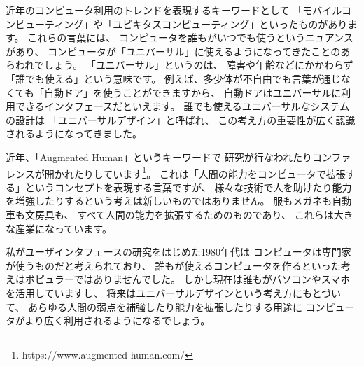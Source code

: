 \documentclass[topics]{compsoft} %
\begin{document}
近年のコンピュータ利用のトレンドを表現するキーワードとして
「モバイルコンピューティング」や「ユビキタスコンピューティング」といったものがあります。
これらの言葉には、
コンピュータを誰もがいつでも使うというニュアンスがあり、
コンピュータが「ユニバーサル」に使えるようになってきたことのあらわれでしょう。
%
「ユニバーサル」というのは、
障害や年齢などにかかわらず「誰でも使える」という意味です。
例えば、多少体が不自由でも言葉が通じなくても「自動ドア」を使うことができますから、
自動ドアはユニバーサルに利用できるインタフェースだといえます。
%
誰でも使えるユニバーサルなシステムの設計は
「ユニバーサルデザイン」と呼ばれ、
この考え方の重要性が広く認識されるようになってきました。




近年、「Augmented Human」というキーワードで
研究が行なわれたりコンファレンスが開かれたりしています\footnote{
  \textsf{https:{\slash}{\slash}www.augmented-human.com{\slash}}
}。
これは「人間の能力をコンピュータで拡張する」というコンセプトを表現する言葉ですが、
様々な技術で人を助けたり能力を増強したりするという考えは新しいものではありません。
服もメガネも自動車も文房具も、
すべて人間の能力を拡張するためのものであり、
これらは大きな産業になっています。

私がユーザインタフェースの研究をはじめた1980年代は
コンピュータは専門家が使うものだと考えられており、
誰もが使えるコンピュータを作るといった考えはポピュラーではありませんでした。
%
しかし現在は誰もがパソコンやスマホを活用していますし、
将来はユニバーサルデザインという考え方にもとづいて、
あらゆる人間の弱点を補強したり能力を拡張したりする用途に
コンピュータがより広く利用されるようになるでしょう。
\end{document}
